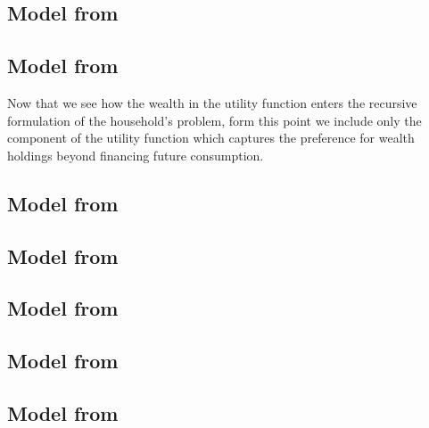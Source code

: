 \documentclass{article}
\begin{document}


\subsection{Model from \cite{Cagetti2003-yp}}



\subsection{Model from \cite{Gourinchas2002-lq}}



Now that we see how the wealth in the utility function enters the recursive formulation of the household's problem, form this point we include only the component of the utility function which captures the preference for wealth holdings beyond financing future consumption. 

\subsection{Model from \cite{De_Nardi2004-xs}}



\subsection{Model from \cite{Dynan2004-bu}}



\subsection{Model from \cite{De_Nardi2016-yi}}



\subsection{Model from \cite{Saez2018-we}}



\subsection{Model from \cite{Straub_undated-gy}}





\printbibliography
\end{document}
